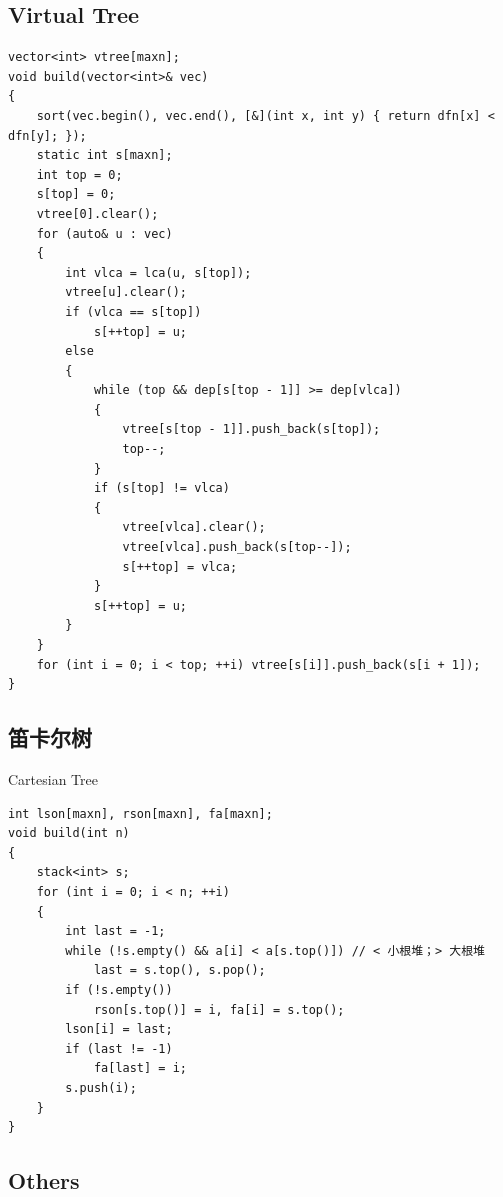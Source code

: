 \documentclass[twoside]{article}
\begin{document}
\subsection{Virtual Tree}
\begin{lstlisting}
vector<int> vtree[maxn];
void build(vector<int>& vec)
{
    sort(vec.begin(), vec.end(), [&](int x, int y) { return dfn[x] < dfn[y]; });
    static int s[maxn];
    int top = 0;
    s[top] = 0;
    vtree[0].clear();
    for (auto& u : vec)
    {
        int vlca = lca(u, s[top]);
        vtree[u].clear();
        if (vlca == s[top])
            s[++top] = u;
        else
        {
            while (top && dep[s[top - 1]] >= dep[vlca])
            {
                vtree[s[top - 1]].push_back(s[top]);
                top--;
            }
            if (s[top] != vlca)
            {
                vtree[vlca].clear();
                vtree[vlca].push_back(s[top--]);
                s[++top] = vlca;
            }
            s[++top] = u;
        }
    }
    for (int i = 0; i < top; ++i) vtree[s[i]].push_back(s[i + 1]);
}
\end{lstlisting}
\subsection{笛卡尔树}
Cartesian Tree
\begin{lstlisting}
int lson[maxn], rson[maxn], fa[maxn];
void build(int n)
{
    stack<int> s;
    for (int i = 0; i < n; ++i)
    {
        int last = -1;
        while (!s.empty() && a[i] < a[s.top()]) // < 小根堆；> 大根堆
            last = s.top(), s.pop();
        if (!s.empty())
            rson[s.top()] = i, fa[i] = s.top();
        lson[i] = last;
        if (last != -1)
            fa[last] = i;
        s.push(i);
    }
}
\end{lstlisting}
\subsection{Others}
\end{document}
